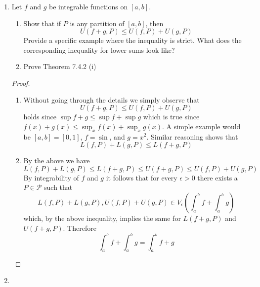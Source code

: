 \begin{enumerate}
\begin{proof}
\begin{enumerate}
        \item This is true, and we demonstrate by contrapositive. So for all \( [c,d] \subseteq [a,b] \) there exists \( x_0 \in [c,d] \) such that
        \[
        f(x_0) \leq 0
        \]
        Thus for every partition \( P \in \mathcal{P} \) there is \( x_k \in I_k \) such that
        \[
        f(x_k) \leq 0 
        \]
        and
        \[
        m_k \leq f(x_k) \leq M_k
        \]
        Thus
        \[
        L(f,P) \leq \sum_k f(x_k)\Delta x_k \leq U(f,P)
        \]
        However, since \( f(x_k) \leq 0 \) it follows \( \sum_k f(x_k) \Delta x_k \leq 0 \). Thus by integrability of \( f \) and the squeeze theorem, it follows that
        \[
        \int_a^b f \leq 0
        \]
    \end{enumerate}
    \end{proof}
    
    \item Let \( f \) and \( g \) be integrable functions on \( [a,b] \).
    \begin{enumerate}
        \item Show that if \( P \) is any partition of \( [a,b] \), then
        \[
        U(f+g,P) \leq U(f,P) + U(g,P)
        \]
        Provide a specific example where the inequality is strict. What does the corresponding inequality for lower sums look like?
        
        \item Prove Theorem 7.4.2 (i)
    \end{enumerate}
    
    \begin{proof}
    \begin{enumerate}
        \item Without going through the details we simply observe that
        \[
        U(f+g,P) \leq U(f,P) + U(g,P)
        \]
        holds since \( \sup f+g \leq \sup f + \sup g \) which is true since \( f(x) + g(x) \leq \sup_x f(x) + \sup_x g(x) \). A simple example would be \( [a,b] = [0,1] \), \( f= \sin \), and \( g= x^2 \). Similar reasoning shows that
        \[
        L(f,P) + L(g,P) \leq L(f+g, P)
        \]
        
        \item By the above we have
        \[
        L(f,P)+L(g,P) \leq L(f+g,P) \leq U(f+g,P) \leq U(f,P) + U(g,P)
        \]
        By integrability of \( f \) and \( g \) it follows that for every \( \epsilon > 0 \) there exists a \( P \in \mathcal{P} \) such that 
        \[
        L(f,P)+L(g,P), U(f,P) + U(g,P) \in V_{\epsilon} \left(\int_a^b f + \int_a^b g\right)
        \]
        which, by the above inequality, implies the same for \( L(f+g,P) \) and \( U(f+g,P) \). Therefore
        \[
        \int_a^b f + \int_a^b g = \int_a^b f+g
        \]
    \end{enumerate}
    \end{proof}
    
    \item 
    
    
    
    
    
    
    
    
    
    
\end{enumerate}